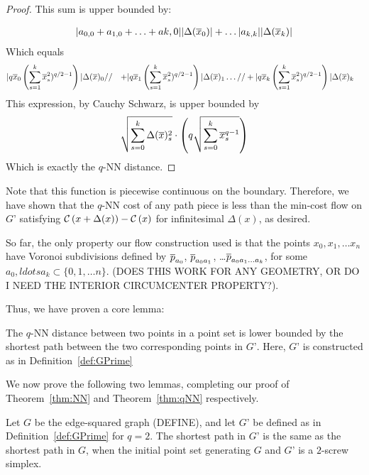 \begin{proof}
This sum is upper bounded by:

\begin{align}
|a_{0, 0} + a_{1, 0} + \ldots + a{k, 0}| |\Delta(\overline{x}_0)|
+ \ldots
|a_{k, k}| |\Delta(\overline{x}_k)|
\end{align}
Which equals
\begin{align}
&|q\overline{x}_0\left(\sum_{s=1}^k \overline{x}_s^2)^{q/2-1}\right)| \Delta(\overline{x})_0
//&+
|q\overline{x}_1\left(\sum_{s=1}^k \overline{x}_s^2)^{q/2-1}\right)| \Delta(\overline{x})_1
\ldots
//& +
|q\overline{x}_k\left(\sum_{s=1}^k \overline{x}_s^2)^{q/2-1}\right)| \Delta(\overline{x})_k
\end{align}
This expression, by Cauchy Schwarz, is upper bounded by
\[
\sqrt{\sum_{s=0}^k \Delta(\overline{x})_s^2} \cdot \left(q\sqrt{\sum_{s=0}^k
\overline{x}_s^{q-1}}\right)
\]
Which is exactly the $q$-NN distance.

\end{proof}

Note that this function is piecewise continuous on the boundary. Therefore,
we have shown that the $q$-NN cost of any path piece is less than the
min-cost flow on $G’$ satisfying
$\mathcal{C}\left(x+\Delta(x)\right)-\mathcal{C}\left(x\right)$ for infinitesimal
$\Delta(x)$, as desired.

So far, the only property our flow construction used is that the points
$x_0, x_1, \ldots x_n$ have Voronoi subdivisions defined by $\overline{p}_{a_0}$,
$\overline{p}_{a_0a_1}$, \ldots $\overline{p}_{a_0a_1\ldots a_k}$, for some $a_0, ldots a_k
\subset \{0, 1, \ldots n\}$. (DOES THIS WORK FOR ANY GEOMETRY, OR DO I NEED
THE INTERIOR CIRCUMCENTER PROPERTY?).

Thus, we have proven a core lemma:

\begin{lemma}\label{lem:qNN-GPrime}

The $q$-NN distance between two points in a point set is lower bounded by
the shortest path between the two corresponding points in $G’$. Here, $G’$
is constructed as in Definition~\ref{def:GPrime}

\end{lemma}

We now prove the following two lemmas, completing our proof of
Theorem~\ref{thm:NN} and Theorem~\ref{thm:qNN} respectively.

\begin{lemma}\label{lem:edge-squared-GPrime} Let $G$ be the edge-squared graph
(DEFINE), and let $G’$ be defined as in Definition~\ref{def:GPrime} for $q=2$.
The shortest path in $G’$ is the same as the shortest path in $G$, when the
initial point set generating $G$ and $G’$ is a $2$-screw simplex.

\end{lemma}

